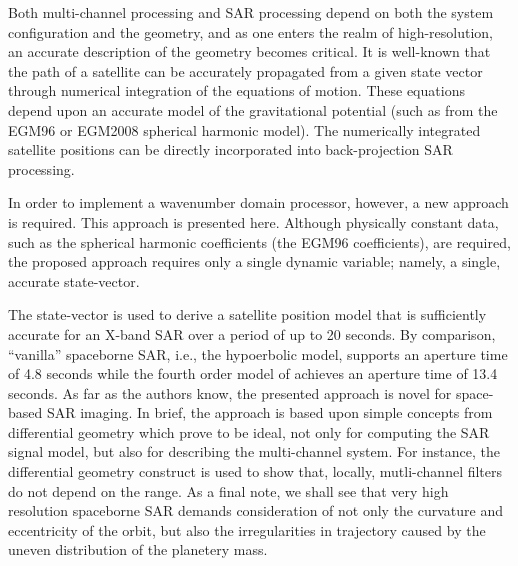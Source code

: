 \par
Both multi-channel processing and SAR processing depend on both the system configuration and the geometry, and as one enters the realm of high-resolution, an accurate description of the geometry becomes critical. It is well-known that the path of a satellite can be accurately propagated from a given state vector through numerical integration of the equations of motion. These equations depend upon an accurate model of the gravitational potential (such as from the EGM96 or EGM2008 spherical harmonic model). The numerically integrated satellite positions can be directly incorporated into back-projection SAR processing. 
\par 
In order to implement a wavenumber domain processor, however, a new approach is required. This approach is presented here. Although physically constant data, such as the spherical harmonic coefficients (the EGM96 coefficients), are required, the proposed approach requires only a single dynamic variable; namely, a single, accurate state-vector. 
\par
The state-vector is used to derive a satellite position model that is sufficiently accurate for an X-band SAR over a period of up to 20 seconds. By comparison, ``vanilla'' spaceborne SAR, i.e., the hypoerbolic model, supports an aperture time of 4.8 seconds while the fourth order model of \cite{Luo2014} achieves an aperture time of 13.4 seconds. As far as the authors know, the presented approach is novel for space-based SAR imaging. In brief, the approach is based upon simple concepts from differential geometry which prove to be ideal, not only for computing the SAR signal model, but also for describing the multi-channel system. For instance, the differential geometry construct is used to show that, locally, mutli-channel filters do not depend on the range. As a final note, we shall see that very high resolution spaceborne SAR demands consideration of not only the curvature and eccentricity of the orbit, but also the irregularities in trajectory caused by the uneven distribution of the planetery mass.
